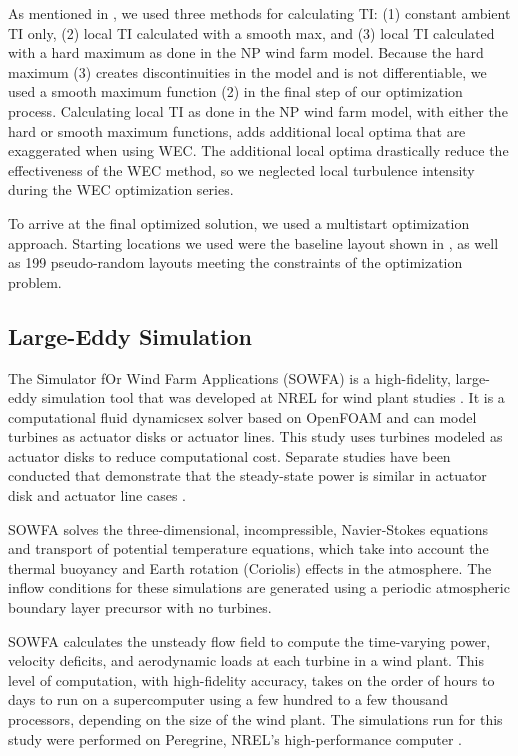 \documentclass[conf]{new-aiaa}
\begin{document}
As mentioned in , we used three methods for calculating TI: (1) constant ambient TI only, (2) local TI calculated with a smooth max, and (3) local TI calculated with a hard maximum as done in the NP wind farm model. Because the hard maximum (3) creates discontinuities in the model and is not differentiable, we used a smooth maximum function (2) in the final step of our optimization process.  Calculating local TI as done in the NP wind farm model, with either the hard or smooth maximum functions, adds additional local optima that are exaggerated when using WEC. The additional local optima drastically reduce the effectiveness of the WEC method, so we neglected local turbulence intensity during the WEC optimization series. 

To arrive at the final optimized solution, we used a multistart optimization approach. Starting locations we used were the baseline layout shown in , as well as 199 pseudo-random layouts meeting the constraints of the optimization problem.

\subsection{Large-Eddy Simulation}

The Simulator fOr Wind Farm Applications (SOWFA) is a high-fidelity, large-eddy simulation tool that was developed at NREL for wind plant studies \cite{churchfieldnwtc,churchfield2012numerical,fleming2013sowfa}.  It is a computational fluid dynamicsex solver based on OpenFOAM \cite{jasak2007openfoam} and can model turbines as actuator disks or actuator lines.  This study uses turbines modeled as actuator disks to reduce computational cost.  Separate studies have been conducted that demonstrate that the steady-state power is similar in actuator disk and actuator line cases \cite{martinez2012comparison}.

SOWFA solves the three-dimensional, incompressible, Navier-Stokes equations and transport of potential temperature equations, which take into account the thermal buoyancy and Earth rotation (Coriolis) effects in the atmosphere.  The inflow conditions for these simulations are generated using a periodic atmospheric boundary layer precursor with no turbines.  

SOWFA calculates the unsteady flow field to compute the time-varying power, velocity deficits, and aerodynamic loads at each turbine in a wind plant.  This level of computation, with high-fidelity accuracy, takes on the order of hours to days to run on a supercomputer using a few hundred to a few thousand processors, depending on the size of the wind plant. The simulations run for this study were performed on Peregrine, NREL's high-performance computer \cite{regimbal2015peregrine}.
\end{document}
